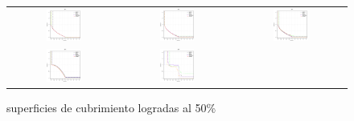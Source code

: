  \begin{figure}[h]
\centering
\caption{superficies de cubrimiento logradas al 50\%}%
\begin{tabular}{ccc}
  \includegraphics[width=0.33\textwidth]{Figures_Chapter7/Results_Chapter3/UF1.eps} &
  \includegraphics[width=0.33\textwidth]{Figures_Chapter7/Results_Chapter3/UF2.eps} &
  \includegraphics[width=0.33\textwidth]{Figures_Chapter7/Results_Chapter3/UF3.eps} 
\\  
  \includegraphics[width=0.33\textwidth]{Figures_Chapter7/Results_Chapter3/UF4.eps} &
  \includegraphics[width=0.33\textwidth]{Figures_Chapter7/Results_Chapter3/UF5.eps} &

\end{tabular}
\end{figure}
